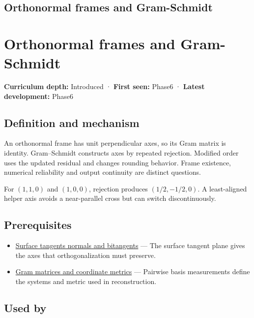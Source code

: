 \hypertarget{appendix-c39f1ed34271}{}
\section*{Orthonormal frames and Gram-Schmidt}
\chapter{Orthonormal frames and Gram-Schmidt}\label{appendix-c39f1ed34271-orthonormal-frames-and-gram-schmidt}

\textbf{Curriculum depth:} Introduced · \textbf{First seen:} Phase6 · \textbf{Latest development:} Phase6

\section{Definition and mechanism}\label{appendix-c39f1ed34271-definition-and-mechanism}

An orthonormal frame has unit perpendicular axes, so its Gram matrix is identity. Gram--Schmidt constructs axes by repeated rejection. Modified order uses the updated residual and changes rounding behavior. Frame existence, numerical reliability and output continuity are distinct questions.

For \((1,1,0)\) and \((1,0,0)\), rejection produces \((1/2,-1/2,0)\). A least-aligned helper axis avoids a near-parallel cross but can switch discontinuously.

\section{Prerequisites}\label{appendix-c39f1ed34271-prerequisites}

\begin{itemize}
\tightlist
\item
  \hyperref[appendix-e31893dec985]{Surface tangents normals and bitangents} --- The surface tangent plane gives the axes that orthogonalization must preserve.
\item
  \hyperref[appendix-3b863809f82a]{Gram matrices and coordinate metrics} --- Pairwise basis measurements define the systems and metric used in reconstruction.
\end{itemize}

\section{Used by}\label{appendix-c39f1ed34271-used-by}


